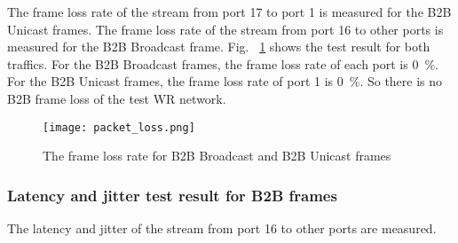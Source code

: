 The frame loss rate of the stream from port 17 to port 1 is measured for the B2B Unicast frames. The frame loss rate of the stream from port 16 to other ports is measured for the B2B Broadcast frame. Fig. ~\ref{packet_loss} shows the test result for both traffics. For the B2B Broadcast frames, the frame loss rate of each port is \SI{0}{\percent}. For the B2B Unicast frames, the frame loss rate of port 1 is \SI{0}{\percent}. So there is no B2B frame loss of the test WR network. 

\begin{figure}[!htb]
   \centering   
   \texttt{[image: packet\_loss.png]}
   \caption{The frame loss rate for B2B Broadcast and B2B Unicast frames}
   \label{packet_loss}
\end{figure}



\subsubsection{Latency and jitter test result for B2B frames}

The latency and jitter of the stream from port 16 to other ports are measured.

